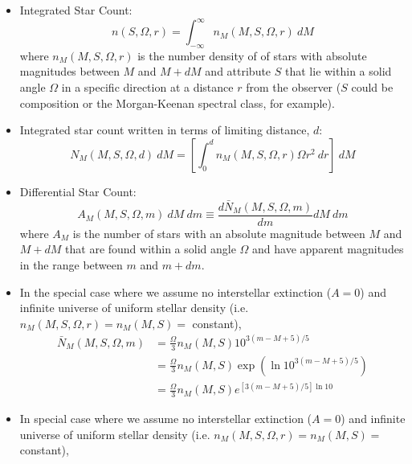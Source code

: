 \documentclass{book}
\begin{document}
\begin{itemize}
    \item Integrated Star Count:
          \begin{equation*}
              n(S, \Omega, r) = \int_{- \infty}^\infty n_M (M, S, \Omega, r)\ dM \tag{C\&O 24.2}
          \end{equation*}
          where $n_M (M, S, \Omega, r)$ is the number density of of stars with absolute magnitudes between $M$ and $M+dM$ and attribute $S$ that lie within a solid angle $\Omega$ in a specific direction at a distance $r$ from the observer ($S$ could be composition or the Morgan-Keenan spectral class, for example).
    \item Integrated star count written in terms of limiting distance, $d$:
          \begin{equation*}
              N_M (M, S, \Omega, d)\ dM = \left[ \int_0^d n_M (M, S, \Omega, r) \Omega r^2\ dr \right]\ dM \tag{C\&O 24.3}
          \end{equation*}
    \item Differential Star Count:
          \begin{equation*}
              A_M (M, S, \Omega, m)\ dM\ dm \equiv \frac{d\bar{N}_M (M, S, \Omega, m)}{dm} dM\ dm \tag{C\&O 24.4}
          \end{equation*}
          where $A_M$ is the number of stars with an absolute magnitude between $M$ and $M+dM$ that are found within a solid angle $\Omega$ and have apparent magnitudes in the range between $m$ and $m+dm$.
    \item In the special case where we assume no interstellar extinction ($A=0$) and infinite universe of uniform stellar density (i.e. $n_M(M, S, \Omega, r) = n_M(M, S) = $ constant),
          \begin{align*}
              \bar{N}_M (M, S, \Omega, m) & = \frac{\Omega}{3} n_M (M, S) 10^{3 (m - M + 5)/5}                        \\
                                          & = \frac{\Omega}{3} n_M (M, S) \exp\left( \ln 10^{3 (m - M + 5)/5} \right) \\
                                          & = \frac{\Omega}{3} n_M (M, S) e^{[3 (m - M + 5)/5]\ln 10}
          \end{align*}
    \item In special case where we assume no interstellar extinction ($A=0$) and infinite universe of uniform stellar density (i.e. $n_M(M, S, \Omega, r) = n_M(M, S) = $ constant),
          \begin{align*}

\end{align*}
\end{itemize}
\end{document}
